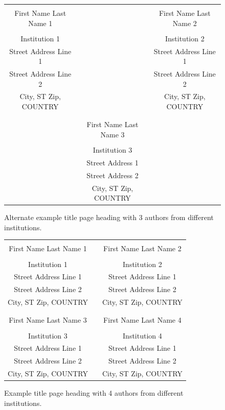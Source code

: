 \documentclass{wscpaperproc}
\theoremstyle{wsc}
\begin{document}
\begin{figure}[htb]
{
\centering
\begin{tabular}{ccc}
\phantom{This adjusts spacing - ignore} & \phantom{This adjusts spacing - ignore} & \phantom{This adjusts spacing - ignore} \\
First Name Last Name 1 & & First Name Last Name 2 \\
\\
Institution 1 & & Institution 2 \\
Street Address Line 1 & & Street Address Line 1 \\
Street Address Line 2 & & Street Address Line 2 \\
City, ST Zip, COUNTRY & & City, ST Zip, COUNTRY \\
\\
\\
& First Name Last Name 3 \\
\\
& Institution 3\\
& Street Address 1 \\
& Street Address 2 \\
& City, ST Zip, COUNTRY
\end{tabular}
\caption{Alternate example title page heading with 3 authors from different institutions. \label{fig: 3 different}}
}
\end{figure}

\begin{figure}[htb]
{
\centering
\begin{tabular}{ccc}
\phantom{Adjust spacing using these entries} & \phantom{intermediate space} & \phantom{Adjust spacing using these entries} \\
First Name Last Name 1 & & First Name Last Name 2 \\
\\
Institution 1 & & Institution 2 \\
Street Address Line 1 & & Street Address Line 1 \\
Street Address Line 2 & & Street Address Line 2 \\
City, ST Zip, COUNTRY & & City, ST Zip, COUNTRY \\
\\ \\
First Name Last Name 3 & & First Name Last Name 4 \\
\\
Institution 3 & & Institution 4 \\
Street Address Line 1 & & Street Address Line 1 \\
Street Address Line 2 & & Street Address Line 2 \\
City, ST Zip, COUNTRY & & City, ST Zip, COUNTRY
\end{tabular}
\caption{Example title page heading with 4 authors from different institutions.\label{fig: 4 different}}
}
\end{figure}
\end{document}
